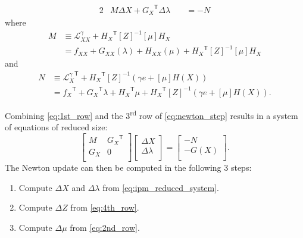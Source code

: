 \documentclass[12pt]{article}
\newcommand{\trans}[1]{{#1}^{\ensuremath{\mathsf{T}}}}  %
\newcommand{\diag}[1]{\left[{#1}\right]}                %
\numberwithin{equation}{section}
\numberwithin{table}{section}
\numberwithin{figure}{section}
\begin{document}
\begin{appendices}
\begin{alignat}{2}
&M \Delta X + \trans{G_X} \Delta \lambda &&\;= -N
\label{eq:1st_row}
\end{alignat}
where
\begin{align}
M &\equiv \mathcal{L}^\gamma_{XX} + \trans{H_X} \diag{Z}^{-1} \diag{\mu} H_X  \\
  &= f_{XX} + G_{XX}(\lambda) + H_{XX}(\mu) + \trans{H_X} \diag{Z}^{-1} \diag{\mu} H_X
\end{align}
and
\begin{align}
N &\equiv \trans{\mathcal{L}^\gamma_X} + \trans{H_X} \diag{Z}^{-1} (\gamma e + \diag{\mu} H(X)) \\
  &= \trans{f_X} + \trans{G_X} \lambda + \trans{H_X} \mu + \trans{H_X} \diag{Z}^{-1} (\gamma e + \diag{\mu} H(X)).
\end{align}

Combining \eqref{eq:1st_row} and the 3\textsuperscript{rd} row of \eqref{eq:newton_step} results in a system of equations of reduced size:
\begin{equation}
\left[\begin{array}{cc}
M & \trans{G_X} \\
G_X & 0 \\
\end{array}\right]
\left[\begin{array}{c}
\Delta X \\
\Delta \lambda \\
\end{array}\right]
= \left[\begin{array}{c}
-N \\
-G(X) \\
\end{array}\right]. \label{eq:ipm_reduced_system}
\end{equation}
The Newton update can then be computed in the following 3 steps:

\begin{enumerate}
\item Compute $\Delta X$ and $\Delta \lambda$ from \eqref{eq:ipm_reduced_system}.
\item Compute $\Delta Z$ from \eqref{eq:4th_row}.
\item Compute $\Delta \mu$ from \eqref{eq:2nd_row}.
\end{enumerate}


\end{appendices}
\end{document}
